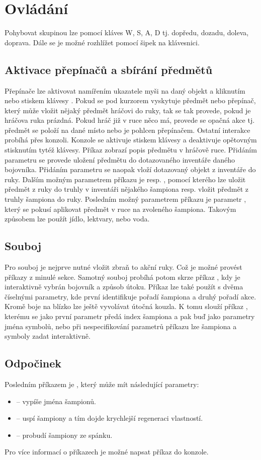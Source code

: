 \section{Ovládání}
Pohybovat skupinou lze pomocí kláves W, S, A, D tj. dopředu, dozadu, doleva, doprava. Dále se je možné rozhlížet pomocí šipek na klávesnici.

\subsection{Aktivace přepínačů a sbírání předmětů}
Přepínače lze aktivovat namířením ukazatele myši na daný objekt a kliknutím nebo stiskem klávesy . Pokud
se pod kurzorem vyskytuje předmět nebo  přepínač, který může vložit nějaký předmět hráčovi do ruky, tak se tak provede, pokud je
hráčova ruka prázdná. Pokud hráč již v ruce něco má, provede se opačná akce tj. předmět se položí na dané místo nebo je 
pohlcen přepínačem. Ostatní interakce probíhá přes konzoli. Konzole se aktivuje stiskem klávesy  a deaktivuje opětovným
stisknutím tytéž klávesy. Příkaz  zobrazí popis předmětu v hráčově ruce. Přidáním parametru  se provede
uložení předmětu do dotazovaného inventáře daného bojovníka. Přidáním parametru  se naopak vloží dotazovaný objekt z inventáře
do ruky. Dalším možným parametrem příkazu je  resp. , pomocí kterého lze uložit předmět z ruky do
truhly v inventáři nějakého šampiona resp. vložit předmět z truhly šampiona do ruky. Posledním možný parametrem příkazu  je
parametr , který se pokusí aplikovat předmět v ruce na zvoleného šampiona. Takovým způsobem lze použít jídlo, lektvary, nebo voda.

\subsection{Souboj}
Pro souboj je nejprve nutné vložit zbraň to akční ruky. Což je možné provést příkazy z minulé sekce.
Samotný souboj probíhá potom skrze příkaz , kdy je interaktivně vybrán bojovník a způsob útoku.
Příkaz lze také použít s dvěma číselnými parametry, kde první identifikuje pořadí šampiona a druhý pořadí akce.
Kromě boje na blízko lze ještě vyvolávat útočná kouzla. K tomu slouží příkaz , kterému se jako první parametr předá index šampiona a pak buď
jako parametry jména symbolů, nebo při nespecifikování parametrů příkazu lze šampiona a symboly zadat interaktivně.

\subsection{Odpočinek}
Posledním příkazem je , který může mít následující parametry:
\begin{itemize}
\item {} -- vypíše jména šampionů.
\item {} -- uspí šampiony a tím dojde krychlejší regeneraci vlastností.
\item {} -- probudí šampiony ze spánku. 
\end{itemize}

Pro více informací o příkazech je možné napsat příkaz  do konzole.